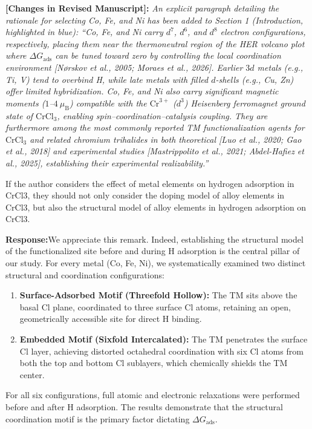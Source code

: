 \documentclass[11pt, sans, a4paper]{moderncv}
\newcommand{\response}{\vspace{0.4em}\noindent\textbf{\color{actionblue}Response:}\hspace{0.5em}}
\newcommand{\manuscriptchange}[1]{\vspace{0.3em}\noindent\textbf{\color{acsblue}[Changes in Revised Manuscript]:} \textit{#1}\vspace{0.4em}}
\begin{document}
\manuscriptchange{An explicit paragraph detailing the rationale for selecting Co, Fe, and Ni has been added to Section 1 (Introduction, highlighted in blue): ``\textit{Co, Fe, and Ni carry $d^7$, $d^6$, and $d^8$ electron configurations, respectively, placing them near the thermoneutral region of the HER volcano plot where $\Delta G_{\mathrm{ads}}$ can be tuned toward zero by controlling the local coordination environment [N{\o}rskov et al., 2005; Moraes et al., 2026]. Earlier $3d$ metals (e.g., Ti, V) tend to overbind H, while late metals with filled $d$-shells (e.g., Cu, Zn) offer limited hybridization. Co, Fe, and Ni also carry significant magnetic moments ($1$--$4~\mu_{\mathrm{B}}$) compatible with the $\text{Cr}^{3+}$ ($d^3$) Heisenberg ferromagnet ground state of $\text{CrCl}_3$, enabling spin--coordination--catalysis coupling. They are furthermore among the most commonly reported TM functionalization agents for $\text{CrCl}_3$ and related chromium trihalides in both theoretical [Luo et al., 2020; Gao et al., 2018] and experimental studies [Mastrippolito et al., 2021; Abdel-Hafiez et al., 2025], establishing their experimental realizability.}''}

\begin{reviewercomment}
If the author considers the effect of metal elements on hydrogen adsorption in CrCl3, they should not only consider the doping model of alloy elements in CrCl3, but also the structural model of alloy elements in hydrogen adsorption on CrCl3.
\end{reviewercomment}

\response We appreciate this remark. Indeed, establishing the structural model of the functionalized site before and during H adsorption is the central pillar of our study. For every metal (Co, Fe, Ni), we systematically examined two distinct structural and coordination configurations:
\begin{enumerate}[leftmargin=1.5em, itemsep=0.2em]
    \item \textbf{Surface-Adsorbed Motif (Threefold Hollow):} The TM sits above the basal Cl plane, coordinated to three surface Cl atoms, retaining an open, geometrically accessible site for direct H binding.
    \item \textbf{Embedded Motif (Sixfold Intercalated):} The TM penetrates the surface Cl layer, achieving distorted octahedral coordination with six Cl atoms from both the top and bottom Cl sublayers, which chemically shields the TM center.
\end{enumerate}
For all six configurations, full atomic and electronic relaxations were performed before and after H adsorption. The results demonstrate that the structural coordination motif is the primary factor dictating $\Delta G_{\mathrm{ads}}$.
\end{document}
